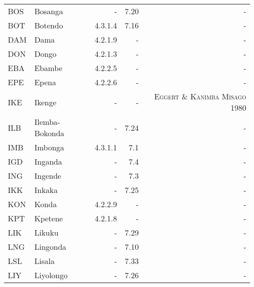 {{\begin{longtable}{@{}llrrr@{}}
BOS &                Bosanga &           - &          7.20 &                    - \\
BOT &                Botendo &     4.3.1.4 &          7.16 &                    - \\
DAM &                   Dama &     4.2.1.9 &             - &                    - \\
DON &                  Dongo &     4.2.1.3 &             - &                    - \\
EBA &                 Ebambe &     4.2.2.5 &             - &                    - \\
EPE &                  Epena &     4.2.2.6 &             - &                    - \\
IKE &                 Ikenge &           - &             - & \textsc{Eggert} \& \textsc{Kanimba Misago} 1980 \\
ILB &         Ilemba-Bokonda &           - &          7.24 &                    - \\
IMB &                Imbonga &     4.3.1.1 &           7.1 &                    - \\
IGD &                Inganda &           - &           7.4 &                    - \\
ING &                Ingende &           - &           7.3 &                    - \\
IKK &                 Inkaka &           - &          7.25 &                    - \\
KON &                  Konda &     4.2.2.9 &             - &                    - \\
KPT &                Kpetene &     4.2.1.8 &             - &                    - \\
LIK &                 Likuku &           - &          7.29 &                    - \\
LNG &               Lingonda &           - &          7.10 &                    - \\
LSL &                 Lisala &           - &          7.33 &                    - \\
LIY &              Liyolongo &           - &          7.26 &                    - \\

\end{longtable}}}

